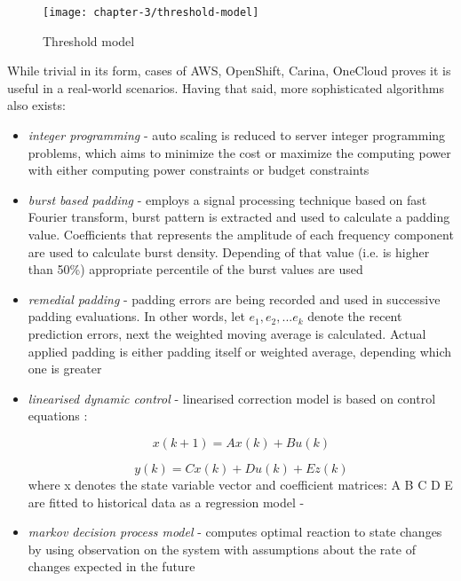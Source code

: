 \begin{figure}[!ht]
  \begin{center}
    \texttt{[image: chapter-3/threshold-model]}
  \end{center}
  \caption{Threshold model}
  \label{ch3:threshold-model}
\end{figure}

While trivial in its form, cases of AWS, OpenShift, Carina, OneCloud proves it is useful in a real-world scenarios. Having that said, more sophisticated algorithms also exists:
\begin{itemize}
  \item \textit{integer programming} - auto scaling is reduced to server integer programming problems, which aims to minimize the cost or maximize the computing power with either computing power constraints or
budget constraints \cite{MaLiHu10}
  \item \textit{burst based padding} - employs a signal processing technique based on fast Fourier transform, burst pattern is extracted and used to calculate a padding value. Coefficients that represents the amplitude of each frequency component are used to calculate burst density. Depending of that value (i.e. is higher than 50\%) appropriate percentile of the burst values are used \cite{ShSuGuWi11}  
  \item \textit{remedial padding} - padding errors are being recorded and used in successive padding evaluations. In other words, let $e_1, e_2, ... e_k$ denote the recent prediction errors, next the weighted moving average is calculated. Actual applied padding is either padding itself or weighted average, depending which one is greater \cite{ShSuGuWi11}    
  \item \textit{linearised dynamic control} - linearised correction model is based on control equations \cite{AbShBh02}:
  
    \begin{equation}
      x(k+1)=Ax(k)+Bu(k)
    \end{equation}
    
    \begin{equation}
       y(k) = C x(k) + D u(k) + E z(k)
    \end{equation}
    where x denotes the state variable vector and coefficient matrices: A B C D E are fitted to historical data as a regression model - \cite{DiLuFrHePa03}

  \item \textit{markov decision process model} - computes optimal reaction to state changes by using observation on the system with assumptions about the rate of changes expected in the future \cite{AbWo02}
\end{itemize}

